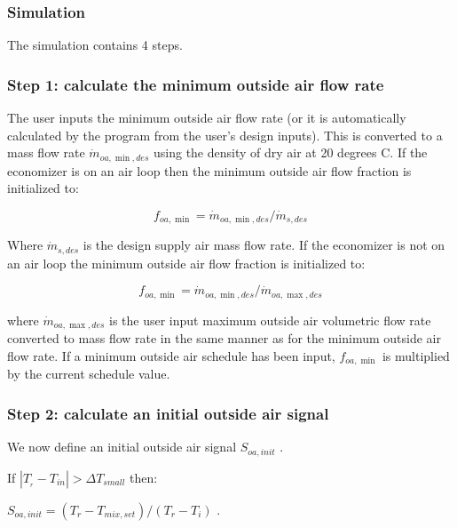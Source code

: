 \subsubsection{Simulation}\label{simulation-000}

The simulation contains 4 steps.

\subsubsection{Step 1: calculate the minimum outside air flow rate}\label{step-1-calculate-the-minimum-outside-air-flow-rate}

The user inputs the minimum outside air flow rate (or it is automatically calculated by the program from the user's design inputs). This is converted to a mass flow rate \({\dot m_{oa,\min ,des}}\) using the density of dry air at 20 degrees C. If the economizer is on an air loop then the minimum outside air flow fraction is initialized to:

\begin{equation}
{f_{oa,\min }} = {\dot m_{oa,\min ,des}}/{\dot m_{s,des}}
\end{equation}

Where \({\dot m_{s,des}}\) is the design supply air mass flow rate. If the economizer is not on an air loop the minimum outside air flow fraction is initialized to:

\begin{equation}
{f_{oa,\min }} = {\dot m_{oa,\min ,des}}/{\dot m_{oa,\max ,des}}
\end{equation}

where \({\dot m_{oa,\max ,des}}\) is the user input maximum outside air volumetric flow rate converted to mass flow rate in the same manner as for the minimum outside air flow rate. If a minimum outside air schedule has been input, \({f_{oa,\min }}\) is multiplied by the current schedule value.

\subsubsection{Step 2: calculate an initial outside air signal}\label{step-2-calculate-an-initial-outside-air-signal}

We now define an initial outside air signal \({S_{oa,init}}\) .

If \(\left| {{T_{_r}} - {T_{in}}} \right| > \Delta {T_{small}}\) then:

\({S_{oa,init}} = ({T_r} - {T_{mix,set}})/({T_r} - {T_i})\) .

